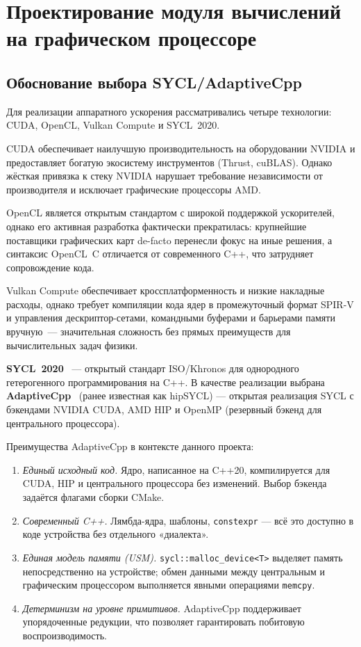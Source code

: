 \section{Проектирование модуля вычислений на графическом процессоре}

\subsection{Обоснование выбора SYCL/AdaptiveCpp}

Для реализации аппаратного ускорения рассматривались четыре технологии: CUDA, OpenCL, Vulkan Compute и 
SYCL~2020.

CUDA обеспечивает наилучшую производительность на оборудовании NVIDIA и предоставляет богатую экосистему 
инструментов (Thrust, cuBLAS). Однако жёсткая привязка к стеку NVIDIA нарушает требование независимости от 
производителя и исключает графические процессоры AMD.

OpenCL является открытым стандартом с широкой поддержкой ускорителей, однако его активная разработка 
фактически прекратилась: крупнейшие поставщики графических карт de-facto перенесли фокус на иные решения, а 
синтаксис OpenCL~C отличается от современного C++, что затрудняет сопровождение кода.

Vulkan Compute обеспечивает кроссплатформенность и низкие накладные расходы, однако требует компиляции кода 
ядер в промежуточный формат SPIR-V и управления дескриптор-сетами, командными буферами и барьерами памяти 
вручную~--- значительная сложность без прямых преимуществ для вычислительных задач физики.

\textbf{SYCL~2020}~\cite{sycl2020spec} --- открытый стандарт ISO/Khronos для однородного гетерогенного 
программирования на C++. В качестве реализации выбрана \textbf{AdaptiveCpp}~\cite{adaptivecpp2024} (ранее 
известная как hipSYCL) --- открытая реализация SYCL с бэкендами NVIDIA CUDA, AMD HIP
и OpenMP (резервный бэкенд для центрального процессора).

Преимущества AdaptiveCpp в контексте данного проекта:
\begin{enumerate}
  \item \textit{Единый исходный код.}
    Ядро, написанное на C++20, компилируется для CUDA, HIP и центрального процессора без изменений.
    Выбор бэкенда задаётся флагами сборки CMake.
  \item \textit{Современный C++.}
    Лямбда-ядра, шаблоны, \texttt{constexpr} --- всё это доступно в коде устройства
    без отдельного «диалекта».
  \item \textit{Единая модель памяти (USM).}
    \texttt{sycl::malloc\_device<T>} выделяет память непосредственно на устройстве;
    обмен данными между центральным и графическим процессором выполняется явными операциями \texttt{memcpy}.
  \item \textit{Детерминизм на уровне примитивов.}
    AdaptiveCpp поддерживает упорядоченные редукции,
    что позволяет гарантировать побитовую воспроизводимость.
\end{enumerate}

